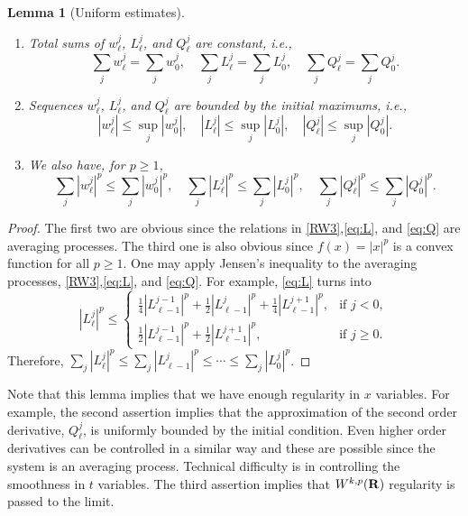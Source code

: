 \documentclass[11pt]{amsart}
\def\R{{\bf R}}
\def\R{{\bf R}}
\newtheorem{lemma}{Lemma}[section]
\begin{document}
\begin{lemma}[Uniform estimates] \label{uniform_est} ~

\begin{enumerate}\item Total sums of $w_\ell^j$, $L_\ell^j$, and
$Q_\ell^j$ are constant, i.e.,
$$
\sum_{j} w^j_\ell = \sum_{j} w^j_0,\quad \sum_{j} L^j_\ell = \sum_{j}
L^j_0,\quad \sum_{j} Q^j_\ell = \sum_{j} Q^j_0.
$$
\item Sequences $w_\ell^j$, $L_\ell^j$, and $Q_\ell^j$ are bounded by the
    initial maximums, i.e.,
  $$
  |w^j_\ell| \le \sup _{j} |w^j_0|,\quad  |L^j_\ell| \le \sup _{j}
  |L^j_0|,\quad |Q^j_\ell| \le \sup _{j} |Q^j_0|.
  $$
\item We also have, for $p\ge1$,
$$
\sum _{j} |w^j_\ell|^p \le \sum _{j} |w^j_0|^p,\quad\sum _{j} |L^j_\ell|^p \le \sum _{j} |L^j_0|^p,\quad \sum _{j} |Q^j_\ell|^p \le
\sum _{j} |Q^j_0|^p.
$$
\end{enumerate}
\end{lemma}
\begin{proof}
The first two are obvious since the relations in \eqref{RW3},\eqref{eq:L}, and \eqref{eq:Q} are averaging processes. The third one is also obvious since $f(x)=|x|^p$ is a convex function for all $p\ge1$. One may apply Jensen's inequality to the averaging processes, \eqref{RW3},\eqref{eq:L}, and \eqref{eq:Q}. For example, \eqref{eq:L} turns into
$$
|L^j_\ell|^p \le \left\{\begin{array}{ll}
        \frac{1}{4}|L_{\ell-1}^{j-1}|^p + \frac{1}{2}|L_{\ell-1}^j|^p +
        \frac{1}{4}|L_{\ell-1}^{j+1}|^p, & \text{if $j<0$},\\
        \frac{1}{2}|L_{\ell-1}^{j-1}|^p + \frac{1}{2}|L_{\ell-1}^{j+1}|^p, &
        \text{if $j\ge0$}.
        \end{array}\right.
$$
Therefore, $\sum _{j} |L^j_\ell|^p \le\sum _{j} |L^j_{\ell-1}|^p\le\cdots\le\sum _{j} |L^j_0|^p$.
\end{proof}

Note that this lemma implies that we have enough regularity in $x$ variables. For example, the second assertion implies that the approximation of the second order derivative, $Q^j_\ell$, is uniformly bounded by the initial condition. Even higher order derivatives can be controlled in a similar way and these are possible since the system is an averaging process. Technical difficulty is in controlling the smoothness in $t$ variables. The third assertion implies that $W^{k,p}(\R)$ regularity is passed to the limit.
\end{document}
